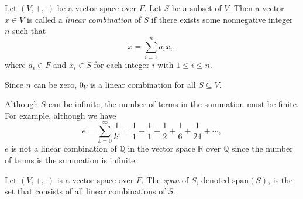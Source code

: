 \begin{definition}\label{def:linear-combination}
  Let $(V, +, \cdot)$ be a vector space over $F$.
  Let $S$ be a subset of $V$.
  Then a vector $x \in V$ is called a \emph{linear combination} of $S$ if
  there exists some nonnegative integer $n$ such that
  \begin{equation*}
    x = \sum_{i=1}^n a_ix_i,
  \end{equation*}
  where $a_i \in F$ and $x_i \in S$ for each integer $i$ with $1 \leq i \leq n$.
\end{definition}
\begin{remark}
  Since $n$ can be zero, $0_V$ is a linear combination for all $S \subseteq V$.
\end{remark}
\begin{remark}
  Although $S$ can be infinite, the number of terms in the summation must be
  finite.
  For example, although we have
  \begin{equation*}
    e = \sum_{k=0}^\infty \frac{1}{k!}
      = \frac{1}{1} + \frac{1}{1} + \frac{1}{2} + \frac{1}{6}
        + \frac{1}{24} + \cdots,
  \end{equation*}
  $e$ is not a linear combination of $\mathbb{Q}$ in the vector space
  $\mathbb{R}$ over $\mathbb{Q}$ since the number of terms is the summation
  is infinite.
\end{remark}

\begin{definition}\label{def:span}
  Let $(V, +, \cdot)$ is a vector space over $F$.
  The \emph{span} of $S$, denoted $\mathrm{span}(S)$, is the set that
  consists of all linear combinations of $S$.
\end{definition}

